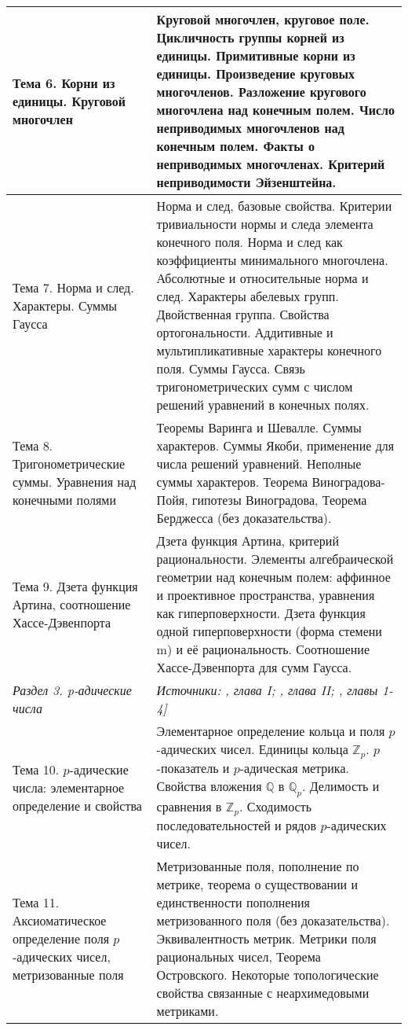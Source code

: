 \documentclass[a4paper, 12pt]{article}
\begin{document}
\begin{longtable}{ | >{\raggedright}p{6cm} | p{9cm} | }
    Тема 6. Корни из единицы. Круговой многочлен & Круговой многочлен, круговое поле. Цикличность группы корней из единицы. Примитивные корни из единицы. Произведение круговых многочленов. Разложение кругового многочлена над конечным полем. Число неприводимых многочленов над конечным полем. Факты о неприводимых многочленах. Критерий неприводимости Эйзенштейна. \\ \hline
    Тема 7. Норма и след. Характеры. Суммы Гаусса & Норма и след, базовые свойства. Критерии тривиальности нормы и следа элемента конечного поля. Норма и след как коэффициенты минимального многочлена. Абсолютные и относительные норма и след. Характеры абелевых групп. Двойственная группа. Свойства ортогональности. Аддитивные и мультипликативные характеры конечного поля. Суммы Гаусса. Связь тригонометрических сумм с числом решений уравнений в конечных полях. \\ \hline
    Тема 8. Тригонометрические суммы. Уравнения над конечными полями & Теоремы Варинга и Шевалле. Суммы характеров. Суммы Якоби, применение для числа решений уравнений. Неполные суммы характеров. Теорема Виноградова-Пойя, гипотезы Виноградова, Теорема Берджесса (без доказательства). \\ \hline
    Тема 9. Дзета функция Артина, соотношение Хассе-Дэвенпорта & Дзета функция Артина, критерий рациональности. Элементы алгебраической геометрии над конечным полем: аффинное и проективное пространства, уравнения как гиперповерхности. Дзета функция одной гиперповерхности (форма стемени m) и её рациональность. Соотношение Хассе-Дэвенпорта для сумм Гаусса. \\ \hline
    \textit{Раздел 3. p-адические числа} & \textit{Источники: \cite{BSh}, глава I; \cite{Serre}, глава II; \cite{Gouv}, главы 1-4]} \\ \hline
    Тема 10. $p$-адические числа: элементарное определение и свойства & Элементарное определение кольца и поля $p$-адических чисел. Единицы кольца $\mathbb{Z}_p$. $p$-показатель и $p$-адическая метрика. Свойства вложения $\mathbb{Q}$ в $\mathbb{Q}_p$. Делимость и сравнения в $\mathbb{Z}_p$. Сходимость последовательностей и рядов $p$-адических чисел. \\ \hline
    Тема 11. Аксиоматическое определение поля $p$-адических чисел, метризованные поля & Метризованные поля, пополнение по метрике, теорема о существовании и единственности пополнения метризованного поля (без доказательства). Эквивалентность метрик. Метрики поля рациональных чисел, Теорема Островского. Некоторые топологические свойства связанные с неархимедовыми метриками.  \\ \hline

\end{longtable}
\end{document}
